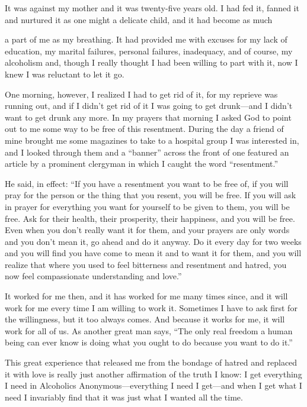 \begin{biblechapter}
It was against my mother and it was twenty-five years old. I had fed it, fanned it and nurtured it as one might a delicate child, and it had become as much

a part of me as my breathing. It had provided me with excuses for my lack of education, my marital failures, personal failures, inadequacy, and of course, my alcoholism and, though I really thought I had been willing to part with it, now I knew I was reluctant to let it go.

One morning, however, I realized I had to get rid of it, for my reprieve was running out, and if I didn’t get rid of it I was going to get drunk—and I didn’t want to get drunk any more. In my prayers that morning I asked God to point out to me some way to be free of this resentment. During the day a friend of mine brought me some magazines to take to a hospital group I was interested in, and I looked through them and a “banner” across the front of one featured an article by a prominent clergyman in which I caught the word “resentment.”

He said, in effect: “If you have a resentment you want to be free of, if you will pray for the person or the thing that you resent, you will be free. If you will ask in prayer for everything you want for yourself to be given to them, you will be free. Ask for their health, their prosperity, their happiness, and you will be free. Even when you don’t really want it for them, and your prayers are only words and you don’t mean it, go ahead and do it anyway. Do it every day for two weeks and you will find you have come to mean it and to want it for them, and you will realize that where you used to feel bitterness and resentment and hatred, you now feel compassionate understanding and love.”

It worked for me then, and it has worked for me many times since, and it will work for me every time I am willing to work it. Sometimes I have to ask first for the willingness, but it too always comes. And because it works for me, it will work for all of us. As another great man says, “The only real freedom a human being can ever know is doing what you ought to do because you want to do it.”

This great experience that released me from the bondage of hatred and replaced it with love is really just another affirmation of the truth I know: I get everything I need in Alcoholics Anonymous—everything I need I get—and when I get what I need I invariably find that it was just what I wanted all the time.
\end{biblechapter}
